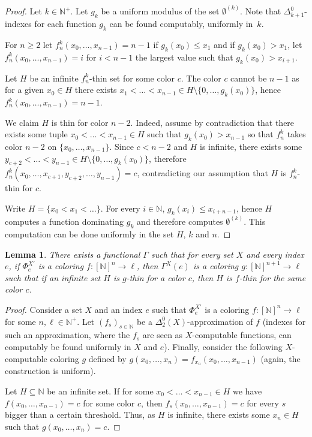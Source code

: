 \documentclass{article}
\newcommand{\NN}[0]{\mathbb{N}}
\numberwithin{theorem}{section}
\newtheorem{lemma}[theorem]{Lemma}
\newcommand{\ludovic}[1]{\textcolor{blue}{#1}}
\newcommand{\lorenzo}[1]{\textcolor{orange}{#1}}
\begin{document}
\begin{proof}
Let $k\in\NN^+$. Let $g_k$ be a uniform modulus of the set $\emptyset^{(k)}$. Note that $\Delta^0_{k+1}$-indexes for each function $g_k$ can be found computably, uniformly in~$k$. 

For $n \geq 2$ let $f_n^k(x_0, \dots,x_{n-1}) = n - 1$ if $g_k(x_0) \leq x_1$ and if $g_k(x_0) > x_1$, let $f_n^k(x_0, \dots,x_{n-1}) = i$ for $i < n - 1$ the largest value such that $g_k(x_0) > x_{i+1}$.

Let $H$ be an infinite $f_n^k$-thin set for some color $c$. The color $c$ cannot be $n-1$ as for a given $x_0 \in H$ there exists $x_1 <\dots < x_{n-1} \in H \setminus \{0, \dots, g_k(x_0)\}$, hence $f^k_n(x_0, \dots, x_{n-1}) = n-1$.

We claim $H$ is thin for color $n-2$. Indeed, assume by contradiction that there exists some tuple $x_0 < \dots < x_{n-1} \in H$ such that $g_k(x_0) > x_{n-1}$ so that $f^k_n$ takes color $n-2$ on $\{x_0, \dots, x_{n-1}\}$. Since $c < n-2$ and $H$ is infinite, there exists some $y_{c+2}< \dots < y_{n-1} \in H \setminus \{0, \dots ,g_k(x_0)\}$, therefore $f^k_n(x_0, \dots, x_{c+1},y_{c+2}, \dots, y_{n-1}) = c$, contradicting our assumption that $H$ is $f_n^k$-thin for $c$.

Write $H = \{x_0 < x_1 < \dots \}$. For every $i \in \NN$, $g_k(x_i) \leq x_{i + n - 1}$, hence $H$ computes a function dominating $g_k$ and therefore computes $\emptyset^{(k)}$. This computation can be done uniformly in the set $H$, $k$ and $n$. 
\end{proof}


\begin{lemma}
    There exists a functional $\Gamma$ such that for every set $X$ and every index $e$, if $\Phi_e^{X'}$ is a coloring $f : [\NN]^n \to \ell$, then $\Gamma^X(e)$ is a coloring $g : [\NN]^{n+1} \to \ell$ such that if an infinite set $H$ is $g$-thin for a color $c$, then $H$ is $f$-thin for the same color $c$. 
\end{lemma}

\begin{proof}
Consider a set $X$ and an index $e$ such that $\Phi_e^{X'}$ is a coloring $f : [\NN]^n \to \ell$ for some $n, \ell \in \NN^+$. Let $(f_s)_{s\in \NN}$ be a $\Delta_2^0(X)$-approximation of $f$ (indexes for such an approximation, where the $f_s$ are seen as $X$-computable functions, can computably be found uniformly in $X$ and $e$). Finally, consider the following $X$-computable coloring $g$ defined by $g(x_0, \dots, x_{n}) = f_{x_n}(x_0, \dots, x_{n-1})$ (again, the construction is uniform).

Let $H \subseteq \NN$ be an infinite set. If for some $x_0 < \dots < x_{n-1} \in H$ we have $f(x_0, \dots, x_{n-1}) = c$ for some color $c$, then $f_s(x_0, \dots, x_{n-1}) = c$ for every $s$ bigger than a certain threshold. Thus, as $H$ is infinite, there exists some $x_n \in H$ such that $g(x_0, \dots, x_n) = c$.  
\end{proof}
\end{document}
